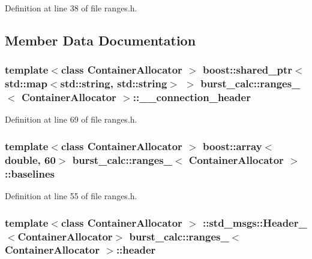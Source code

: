 \-Definition at line 38 of file ranges.\-h.



\subsection{\-Member \-Data \-Documentation}
\subsubsection[{\-\_\-\-\_\-connection\-\_\-header}]{\setlength{\rightskip}{0pt plus 5cm}template$<$class Container\-Allocator $>$ boost\-::shared\-\_\-ptr$<$std\-::map$<$std\-::string, std\-::string$>$ $>$ {\bf burst\-\_\-calc\-::ranges\-\_\-}$<$ \-Container\-Allocator $>$\-::{\bf \-\_\-\-\_\-connection\-\_\-header}}\label{structburst__calc_1_1ranges___aa378ed188f86770f214b225c932da597}


\-Definition at line 69 of file ranges.\-h.

\subsubsection[{baselines}]{\setlength{\rightskip}{0pt plus 5cm}template$<$class Container\-Allocator $>$ boost\-::array$<$double, 60$>$ {\bf burst\-\_\-calc\-::ranges\-\_\-}$<$ \-Container\-Allocator $>$\-::{\bf baselines}}\label{structburst__calc_1_1ranges___a176fbade6a5a27983ccdcca258f8d0f1}


\-Definition at line 55 of file ranges.\-h.

\subsubsection[{header}]{\setlength{\rightskip}{0pt plus 5cm}template$<$class Container\-Allocator $>$ \-::std\-\_\-msgs\-::\-Header\-\_\-$<$\-Container\-Allocator$>$ {\bf burst\-\_\-calc\-::ranges\-\_\-}$<$ \-Container\-Allocator $>$\-::{\bf header}}\label{structburst__calc_1_1ranges___ad08cdb67e1de0764b7fd9388bcee99ed}


